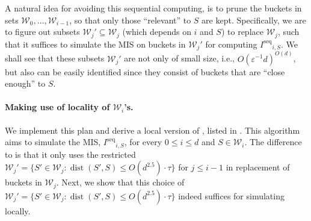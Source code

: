 \documentclass[11pt,letterpaper]{article}
\theoremstyle{plain}
\theoremstyle{definition}
\theoremstyle{remark}
\DeclareMathOperator{\dist}{dist}
\newcommand{\Iseq}{\ensuremath{I^{\mathrm{seq}}}\xspace}
\begin{document}
A natural idea for avoiding this sequential computing, is to prune the buckets in sets $\mathcal{W}_0, \ldots, \mathcal{W}_{i - 1}$, so that only those ``relevant'' to $S$ are kept. 
Specifically, we are to figure out subsets $\mathcal{W}_j' \subseteq \mathcal{W}_j$ (which depends on $i$ and $S$) to replace $\mathcal{W}_j$, such that it suffices to simulate the MIS on buckets in $\mathcal{W}_j'$ for computing $\Iseq_{i, S}$. 
We shall see that these subsets $\mathcal{W}_j'$ are not only of small size, i.e., $O(\varepsilon^{-1}d)^{O(d)}$, but also can be easily identified since they consist of buckets that are ``close enough'' to $S$.


\paragraph{Making use of locality of $\mathcal{W}_i$'s.}
We implement this plan and derive a local version of , listed in . 
This algorithm aims to simulate the MIS, $\Iseq_{i, S}$, for every $0 \leq i \leq d$ and $S \in \mathcal{W}_i$. 
The difference to  is that it only uses the restricted 
$\mathcal{W}_j' = \{ S' \in \mathcal{W}_j : \dist(S', S) \leq O(d^{2.5}) \cdot \tau \}$ for $j \leq i - 1$ in replacement of buckets in $\mathcal{W}_j$. 
Next, we show that this choice of  $\mathcal{W}_j' = \{ S' \in \mathcal{W}_j : \dist(S', S) \leq O(d^{2.5}) \cdot \tau \}$ indeed suffices for simulating  locally.
\end{document}
